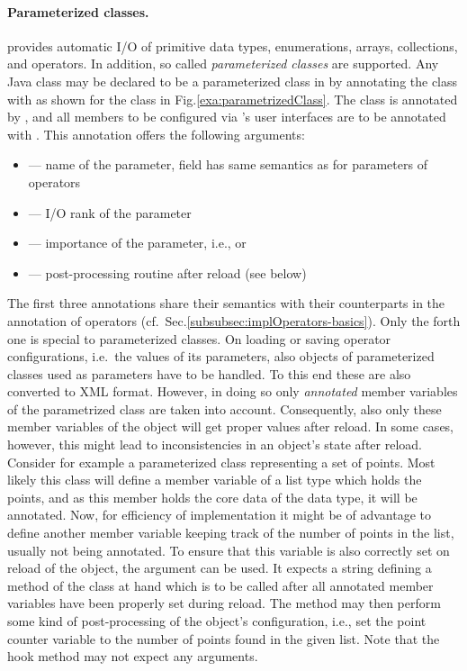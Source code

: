 \paragraph{Parameterized classes.}
\alida provides automatic I/O of primitive data types, enumerations, arrays, collections,
and operators.
In addition, so called \textit{parameterized classes} are supported.
Any Java class may be declared to be a parameterized class in \alida
by annotating the class with  as shown for the
class  in Fig.\ref{exa:parametrizedClass}.
The class is annotated by ,
and all members to be configured via \alida's user interfaces are
to be annotated with . This annotation offers the
following arguments:
\begin{itemize}
  \item {} --- name of the parameter, field has same
	semantics as for parameters of operators
  \item {} --- I/O rank of the parameter	 
  \item {} ---
	importance of the parameter, i.e.,  or 	 
  \item {} --- post-processing routine after reload (see
  below)
\end{itemize}

The first three annotations share their semantics with their counterparts in the
 annotation of operators
(cf.~Sec.\ref{subsubsec:implOperators-basics}).
Only the forth one is special to parameterized classes. On loading or saving
operator configurations, i.e.~the values of its parameters, also objects of
parameterized classes used as parameters have to be handled. To this end these
are also converted to XML format. However, in doing so only {\em annotated}
member variables of the parametrized class are taken into account. Consequently,
also only these member variables of the object will get proper values after
reload.
In some cases, however, this might lead to inconsistencies in an object's state
after reload. Consider for example a parameterized class representing a set of
points. Most likely this class will define a member variable of a list type
which holds the points, and as this member holds the core data of the data
type, it will be annotated.
Now, for efficiency of implementation it might be of advantage to define another
member variable keeping track of the number of points in the list, usually not
being annotated. To ensure that this variable is also correctly set on reload of
the object, the  argument can be used. It expects a
string defining a method of the class at hand which is to be called after all
annotated member variables have been properly set during reload. The method may
then perform some kind of post-processing of the object's configuration, i.e.,
set the point counter variable to the number of points found in the given list.
Note that the hook method may not expect any arguments.

